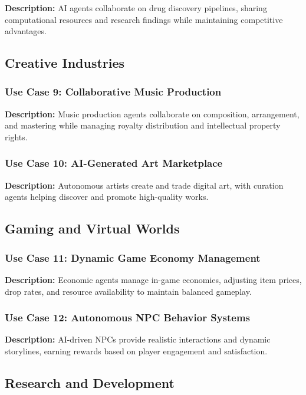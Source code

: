 \documentclass[12pt,a4paper]{article}
\begin{document}
\textbf{Description:} AI agents collaborate on drug discovery pipelines, sharing computational resources and research findings while maintaining competitive advantages.

\subsection{Creative Industries}

\subsubsection{Use Case 9: Collaborative Music Production}

\textbf{Description:} Music production agents collaborate on composition, arrangement, and mastering while managing royalty distribution and intellectual property rights.

\subsubsection{Use Case 10: AI-Generated Art Marketplace}

\textbf{Description:} Autonomous artists create and trade digital art, with curation agents helping discover and promote high-quality works.

\subsection{Gaming and Virtual Worlds}

\subsubsection{Use Case 11: Dynamic Game Economy Management}

\textbf{Description:} Economic agents manage in-game economies, adjusting item prices, drop rates, and resource availability to maintain balanced gameplay.

\subsubsection{Use Case 12: Autonomous NPC Behavior Systems}

\textbf{Description:} AI-driven NPCs provide realistic interactions and dynamic storylines, earning rewards based on player engagement and satisfaction.

\subsection{Research and Development}
\end{document}
